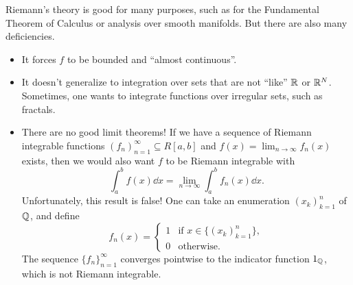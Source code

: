 Riemann's theory is good for many purposes, such as for the Fundamental 
Theorem of Calculus or analysis over smooth manifolds. But there are also 
many deficiencies. 
\begin{itemize}
    \item It forces $f$ to be bounded and ``almost continuous''. 
    \item It doesn't generalize to integration over sets that are not ``like''
    $\mathbb{R}$ or $\mathbb{R}^N$. Sometimes, one wants to integrate functions over 
    irregular sets, such as fractals. 
    \item There are no good limit theorems! If we have a 
    sequence of Riemann integrable functions $(f_n)_{n=1}^\infty \subseteq 
    R[a, b]$ and $f(x) = \lim_{n\to\infty} f_n(x)$ exists, then we would also 
    want $f$ to be Riemann integrable with 
    \[ \int_a^b f(x)\dd x = \lim_{n\to\infty} \int_a^b f_n(x)\dd x. \] 
    Unfortunately, this result is false! One can take an enumeration 
    $(x_k)_{k=1}^n$ of $\mathbb{Q}$, and define 
    \[ f_n(x) = \begin{cases} 
        1 & \text{if } x \in \{(x_k)_{k=1}^n\}, \\
        0 & \text{otherwise.}
    \end{cases} \] 
    The sequence $\{f_n\}_{n=1}^\infty$ converges pointwise to the 
    indicator function $1_{\mathbb{Q}}$, which is not Riemann integrable. 
\end{itemize}